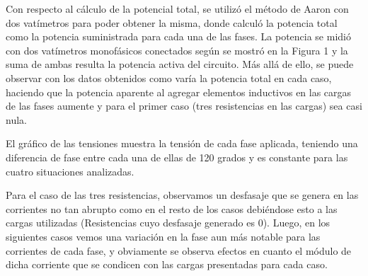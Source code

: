 \documentclass[a4paper]{article}
\begin{document}
Con respecto al cálculo de la potencial total, se utilizó el método de Aaron con dos vatímetros para poder obtener la misma, donde calculó la potencia total como la potencia suministrada para cada una de las fases. La potencia se midió con dos vatímetros monofásicos conectados según se mostró en la Figura 1 y la suma de 
ambas resulta la potencia activa del circuito. Más allá de ello, se puede observar con los datos obtenidos
como varía la potencia total en cada caso, haciendo que la potencia aparente al agregar elementos inductivos en las cargas de las fases aumente y para el primer caso (tres resistencias en las cargas) sea casi nula.


El gráfico de las tensiones muestra la tensión de cada fase aplicada, teniendo una diferencia de fase entre cada una de ellas de 120 grados y es constante para las cuatro situaciones analizadas.


Para el caso de las tres resistencias, observamos un desfasaje que se genera en las corrientes no tan abrupto como en el resto de los casos debiéndose esto a las cargas utilizadas (Resistencias cuyo desfasaje generado es 0). Luego, en los siguientes casos vemos una variación en la fase aun más notable para las corrientes de cada fase, y obviamente se observa efectos en cuanto el módulo de dicha corriente que se condicen con las cargas presentadas para cada caso.
\end{document}
